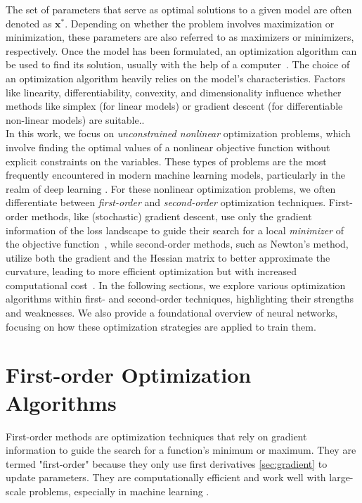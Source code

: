 The set of parameters that serve as optimal solutions to a given model are often denoted as $\mathbf{x^*}$.
Depending on whether the problem involves maximization or minimization, these parameters are also referred to as maximizers or minimizers, respectively.
Once the model has been formulated, an optimization algorithm can be used to
find its solution, usually with the help of a computer~\cite{nocedal2006numerical}. 
The choice of an optimization algorithm heavily relies on the model's characteristics.
Factors like linearity, differentiability, convexity, and dimensionality influence whether methods like simplex (for linear models)
or gradient descent (for differentiable non-linear models) are suitable.\cite{sun2019survey}.\\
In this work, we focus on \emph{unconstrained nonlinear } optimization problems, which involve finding the optimal values of a nonlinear objective function 
without explicit constraints on the variables.
These types of problems are the most frequently encountered in modern machine learning models, particularly in the realm of deep learning \cite{Goodfellow-et-al-2016}.
For these nonlinear optimization problems, we often differentiate between \emph{first-order} and \emph{second-order} optimization techniques.
First-order methods, like (stochastic) gradient descent, use only the gradient information of the loss landscape to guide their search for
a local \emph{minimizer} of the objective function~\cite{kashyap2023survey},
while second-order methods, such as Newton's method, utilize both the gradient and the Hessian matrix to better approximate the curvature,
leading to more efficient optimization but with increased computational cost~\cite{yao2021adahessian}.
In the following sections, we explore various optimization algorithms within first- and second-order techniques,
highlighting their strengths and weaknesses.
We also provide a foundational overview of neural networks, focusing on how these optimization strategies are applied to train them. 


\section{First-order Optimization Algorithms}
\label{sec:firstorder}

First-order methods are optimization techniques that rely on gradient information to guide the search for a function's minimum or maximum.
They are termed "first-order" because they only use first derivatives \ref{sec:gradient} to update parameters.
They are computationally efficient and work well with large-scale problems, especially in machine learning \cite{Goodfellow-et-al-2016}.
